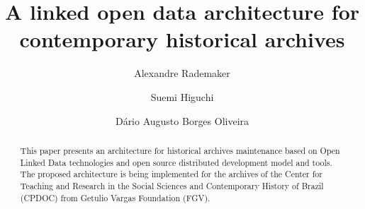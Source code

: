 \documentclass{llncs}
\begin{document}
\title{A linked open data architecture for contemporary historical archives}  
\author{Alexandre Rademaker 
  \and Suemi Higuchi
  \and D\'ario Augusto Borges Oliveira}
\maketitle

\begin{abstract}
  This paper presents an architecture for historical archives
  maintenance based on Open Linked Data technologies and open source
  distributed development model and tools. The proposed architecture
  is being implemented for the archives of the Center for Teaching and
  Research in the Social Sciences and Contemporary History of Brazil
  (CPDOC) from Getulio Vargas Foundation (FGV).
\end{abstract}










\end{document}
